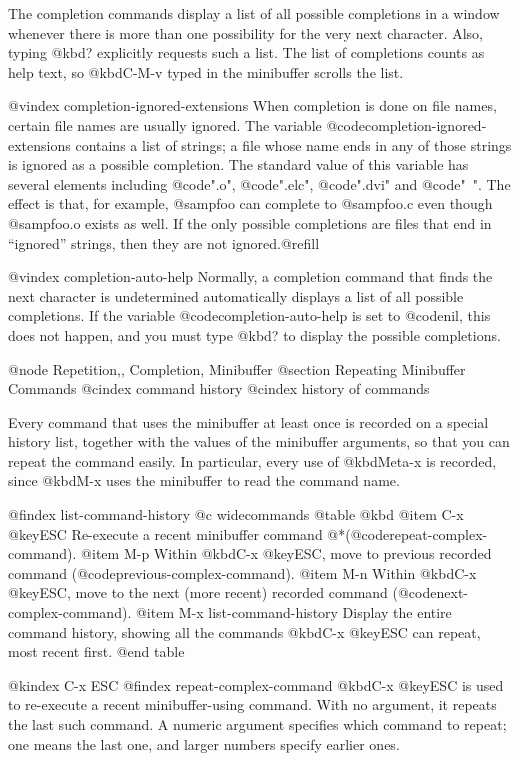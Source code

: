 {{{{{{  The completion commands display a list of all possible completions in a
window whenever there is more than one possibility for the very next
character.  Also, typing @kbd{?} explicitly requests such a list.  The
list of completions counts as help text, so @kbd{C-M-v} typed in the
minibuffer scrolls the list.

@vindex completion-ignored-extensions
  When completion is done on file names, certain file names are usually
ignored.  The variable @code{completion-ignored-extensions} contains a list
of strings; a file whose name ends in any of those strings is ignored as a
possible completion.  The standard value of this variable has several
elements including @code{".o"}, @code{".elc"}, @code{".dvi"} and @code{"~"}.
The effect is that, for example, @samp{foo} can complete to @samp{foo.c}
even though @samp{foo.o} exists as well.  If the only possible completions
are files that end in ``ignored'' strings, then they are not ignored.@refill

@vindex completion-auto-help
  Normally, a completion command that finds the next character is undetermined
automatically displays a list of all possible completions.  If the variable
@code{completion-auto-help} is set to @code{nil}, this does not happen,
and you must type @kbd{?} to display the possible completions.

@node Repetition,, Completion, Minibuffer
@section Repeating Minibuffer Commands
@cindex command history
@cindex history of commands

  Every command that uses the minibuffer at least once is recorded on a
special history list, together with the values of the minibuffer arguments,
so that you can repeat the command easily.  In particular, every
use of @kbd{Meta-x} is recorded, since @kbd{M-x} uses the minibuffer to
read the command name.

@findex list-command-history
@c widecommands
@table @kbd
@item C-x @key{ESC}
Re-execute a recent minibuffer command @*(@code{repeat-complex-command}).
@item M-p
Within @kbd{C-x @key{ESC}}, move to previous recorded command
(@code{previous-complex-command}).
@item M-n
Within @kbd{C-x @key{ESC}}, move to the next (more recent) recorded
command (@code{next-complex-command}).
@item M-x list-command-history
Display the entire command history, showing all the commands
@kbd{C-x @key{ESC}} can repeat, most recent first.
@end table

@kindex C-x ESC
@findex repeat-complex-command
  @kbd{C-x @key{ESC}} is used to re-execute a recent minibuffer-using
command.  With no argument, it repeats the last such command.  A numeric
argument specifies which command to repeat; one means the last one, and
larger numbers specify earlier ones.

}}}}}}
